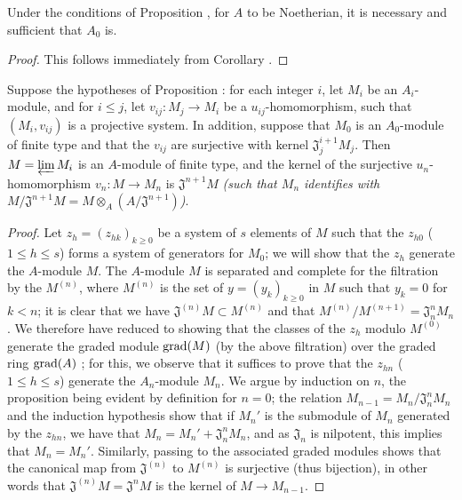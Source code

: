 \begin{corollary}[7.2.8]
\label{0.7.2.8}
Under the conditions of Proposition , for $A$ to
be Noetherian, it is necessary and sufficient that $A_0$ is.
\end{corollary}

\begin{proof}
\label{proof-0.7.2.8}
This follows immediately from Corollary .
\end{proof}

\begin{proposition}[7.2.9]
\label{0.7.2.9}
Suppose the hypotheses of Proposition : for each integer $i$,
let $M_i$ be an $A_i$-module, and for $i\leq j$, let $v_{ij}:M_j\to M_i$ be a
$u_{ij}$-homomorphism, such that $(M_i,v_{ij})$ is a projective system. In addition, suppose
that $M_0$ is an $A_0$-module of finite type and that the $v_{ij}$ are surjective with kernel
$\mathfrak{J}_j^{i+1}M_j$. Then $M=\varprojlim M_i$ is an $A$-module of finite type, and the
kernel of the surjective $u_n$-homomorphism $v_n:M\to M_n$ is $\mathfrak{J}^{n+1}M$
\emph{(such that $M_n$ identifies with
$M/\mathfrak{J}^{n+1}M=M\otimes_A(A/\mathfrak{J}^{n+1})$)}.
\end{proposition}

\begin{proof}
\label{proof-0.7.2.9}
Let $z_h=(z_{hk})_{k\geq 0}$ be a system of $s$ elements of $M$ such that the $z_{h0}$
($1\leq h\leq s$) forms a system of generators for $M_0$; we will show that the
$z_h$ generate the $A$-module $M$. The $A$-module $M$ is separated and complete for the
filtration by the $M^{(n)}$, where $M^{(n)}$ is the set of $y=(y_k)_{k\geq 0}$ in $M$
such that $y_k=0$ for $k<n$; it is clear that we have $\mathfrak{J}^{(n)}M\subset M^{(n)}$
and that $M^{(n)}/M^{(n+1)}=\mathfrak{J}_n^n M_n$. We therefore have reduced to showing that
the classes of the $z_h$ modulo $M^{(0)}$ generate the graded module ${\mathop{\mathrm{grad}}\nolimits}(M)$ (by the
above filtration) over the graded ring ${\mathop{\mathrm{grad}}\nolimits}(A)$ \cite[p.~18--06, lemme]{I-1}; for this, we
observe that it suffices to prove that the $z_{hn}$ ($1\leq h\leq s$) generate the
$A_n$-module $M_n$. We argue by induction on $n$, the proposition being evident by definition
for $n=0$; the relation $M_{n-1}=M_n/\mathfrak{J}_n^n M_n$ and the induction hypothesis show
that if $M_n'$ is the submodule of $M_n$ generated by the $z_{hn}$, we have that
$M_n=M_n'+\mathfrak{J}_n^n M_n$, and as $\mathfrak{J}_n$ is nilpotent, this implies that
$M_n=M_n'$. Similarly, passing to the associated graded modules shows that the canonical map
from $\mathfrak{J}^{(n)}$ to $M^{(n)}$ is surjective (thus bijection), in other words that
$\mathfrak{J}^{(n)}M=\mathfrak{J}^n M$ is the kernel of $M\to M_{n-1}$.
\end{proof}

